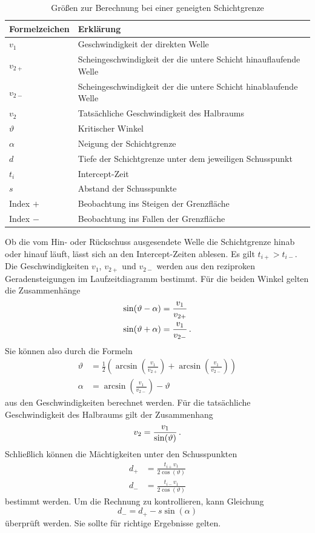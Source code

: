 \begin{table}[!ht]
\centering
\caption{Größen zur Berechnung bei einer geneigten Schichtgrenze}
\label{tab:groessen}
\begin{tabular}{ll}
\toprule
Formelzeichen   & Erklärung  \\
\midrule
$v_1$ & Geschwindigkeit der direkten Welle \\
$v_{2+}$  &  Scheingeschwindigkeit der die untere Schicht hinauflaufende Welle\\
$v_{2-}$  &  Scheingeschwindigkeit der die untere Schicht hinablaufende Welle\\
$v_2$ & Tatsächliche Geschwindigkeit des Halbraums \\
$\vartheta$  &  Kritischer Winkel\\
$\alpha$  &  Neigung der Schichtgrenze \\
$d$  & Tiefe der Schichtgrenze unter dem jeweiligen Schusspunkt \\
$t_i$  &  Intercept-Zeit\\
$s$ & Abstand der Schusspunkte\\
Index $+$  & Beobachtung ins Steigen der Grenzfläche \\
Index $-$  & Beobachtung ins Fallen der Grenzfläche \\
\bottomrule
\end{tabular}
\end{table}

Ob die vom Hin- oder Rückschuss ausgesendete Welle die Schichtgrenze hinab oder hinauf läuft, lässt sich an den Intercept-Zeiten ablesen. Es gilt $t_{i+}>t_{i-}$. Die Geschwindigkeiten $v_1$, $v_{2+}$ und $v_{2-}$ werden aus den reziproken Geradensteigungen im Laufzeitdiagramm bestimmt. Für die beiden Winkel gelten die Zusammenhänge
\begin{align}
 \sin(\vartheta-\alpha)&=\frac{v_1}{v_{2+}} \\
 \sin(\vartheta+\alpha)&=\frac{v_1}{v_{2-}} \text{\,.}
\end{align}
Sie können also durch die Formeln
\begin{align}
 \vartheta&=\frac{1}{2}\left(\arcsin\left(\frac{v_1}{v_{2+}}\right)+\arcsin\left(\frac{v_1}{v_{2-}}\right)\right) \\
 \alpha&=\arcsin\left(\frac{v_1}{v_{2-}}\right)-\vartheta
\end{align}
aus den Geschwindigkeiten berechnet werden. Für die tatsächliche Geschwindigkeit des Halbraums gilt der Zusammenhang
\begin{equation}
 v_2=\frac{v_1}{\sin(\vartheta)} \text{\,.}
\end{equation}
Schließlich können die Mächtigkeiten unter den Schusspunkten
\begin{align}
 d_+&=\frac{t_{i+}v_1}{2\cos(\vartheta)} \\
 d_-&=\frac{t_{i-}v_1}{2\cos(\vartheta)}
\end{align}
bestimmt werden. Um die Rechnung zu kontrollieren, kann Gleichung
\begin{equation}
 d_-=d_+-s\sin(\alpha)
\end{equation}
überprüft werden. Sie sollte für richtige Ergebnisse gelten.

